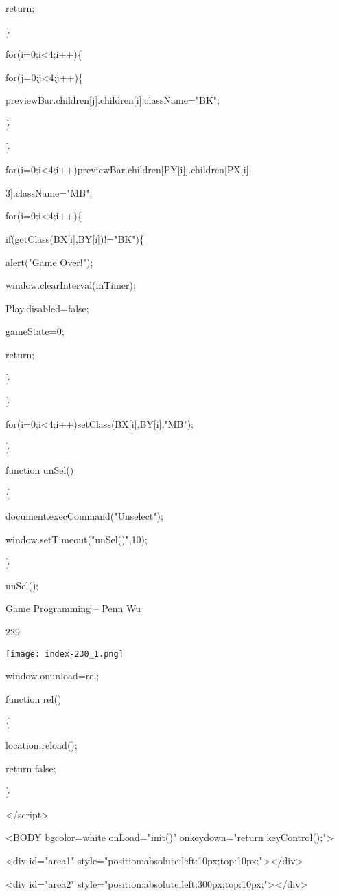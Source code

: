 \documentclass[
]{article}
\begin{document}
return;

\}

for(i=0;i\textless4;i++)\{

for(j=0;j\textless4;j++)\{

previewBar.children{[}j{]}.children{[}i{]}.className="BK";

\}

\}

for(i=0;i\textless4;i++)previewBar.children{[}PY{[}i{]}{]}.children{[}PX{[}i{]}-

3{]}.className="MB";

for(i=0;i\textless4;i++)\{

if(getClass(BX{[}i{]},BY{[}i{]})!="BK")\{

alert("Game Over!");

window.clearInterval(mTimer);

Play.disabled=false;

gameState=0;

return;

\}

\}

for(i=0;i\textless4;i++)setClass(BX{[}i{]},BY{[}i{]},"MB");

\}

function unSel()

\{

document.execCommand("Unselect");

window.setTimeout("unSel()",10);

\}

unSel();

Game Programming -- Penn Wu

229

\protect\hypertarget{index_split_011.htmlux5cux23p230}{}{}\texttt{[image: index-230\_1.png]}

window.onunload=rel;

function rel()

\{

location.reload();

return false;

\}

\textless/script\textgreater{}

\textless BODY bgcolor=white onLoad="init()" onkeydown="return
keyControl();"\textgreater{}

\textless div id="area1"
style="position:absolute;left:10px;top:10px;"\textgreater\textless/div\textgreater{}

\textless div id="area2"
style="position:absolute;left:300px;top:10px;"\textgreater\textless/div\textgreater{}
\end{document}
